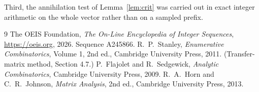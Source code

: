\documentclass[11pt,a4paper]{article}
\theoremstyle{plain}
\theoremstyle{definition}
\begin{document}
Third, the annihilation test of Lemma~\ref{lem:crit} was carried out in exact integer
arithmetic on the whole vector rather than on a sampled prefix.

\begin{thebibliography}{9}
 The OEIS Foundation, \emph{The On-Line Encyclopedia of Integer
Sequences}, \url{https://oeis.org}, 2026. Sequence A245866.
 R.~P.~Stanley, \emph{Enumerative Combinatorics}, Volume 1, 2nd ed.,
Cambridge University Press, 2011. (Transfer-matrix method, Section 4.7.)
 P.~Flajolet and R.~Sedgewick, \emph{Analytic Combinatorics}, Cambridge
University Press, 2009.
 R.~A.~Horn and C.~R.~Johnson, \emph{Matrix Analysis}, 2nd ed., Cambridge
University Press, 2013.
\end{thebibliography}
\end{document}
